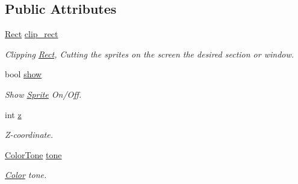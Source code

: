 \subsection*{Public Attributes}
\begin{DoxyCompactItemize}
\item 
\hypertarget{class_f2_c_1_1_viewport_ab28f5a116dbdb5facc9a5116a11582e8}{
\hyperlink{class_f2_c_1_1_rect}{Rect} \hyperlink{class_f2_c_1_1_viewport_ab28f5a116dbdb5facc9a5116a11582e8}{clip\_\-rect}}
\label{class_f2_c_1_1_viewport_ab28f5a116dbdb5facc9a5116a11582e8}

\begin{DoxyCompactList}\small\item\em Clipping \hyperlink{class_f2_c_1_1_rect}{Rect}, Cutting the sprites on the screen the desired section or window. \item\end{DoxyCompactList}\item 
\hypertarget{class_f2_c_1_1_viewport_a0a668b787c2404ad479b74fb6d7c6771}{
bool \hyperlink{class_f2_c_1_1_viewport_a0a668b787c2404ad479b74fb6d7c6771}{show}}
\label{class_f2_c_1_1_viewport_a0a668b787c2404ad479b74fb6d7c6771}

\begin{DoxyCompactList}\small\item\em Show \hyperlink{class_f2_c_1_1_sprite}{Sprite} On/Off. \item\end{DoxyCompactList}\item 
\hypertarget{class_f2_c_1_1_viewport_a7abd237e5e7b3813ed69b9e7885a89df}{
int \hyperlink{class_f2_c_1_1_viewport_a7abd237e5e7b3813ed69b9e7885a89df}{z}}
\label{class_f2_c_1_1_viewport_a7abd237e5e7b3813ed69b9e7885a89df}

\begin{DoxyCompactList}\small\item\em Z-\/coordinate. \item\end{DoxyCompactList}\item 
\hypertarget{class_f2_c_1_1_viewport_abd92aae23fe773ad344513a6b9a9b231}{
\hyperlink{class_f2_c_1_1_color_tone}{ColorTone} \hyperlink{class_f2_c_1_1_viewport_abd92aae23fe773ad344513a6b9a9b231}{tone}}
\label{class_f2_c_1_1_viewport_abd92aae23fe773ad344513a6b9a9b231}

\begin{DoxyCompactList}\small\item\em \hyperlink{class_f2_c_1_1_color}{Color} tone. \item\end{DoxyCompactList}\end{DoxyCompactItemize}


